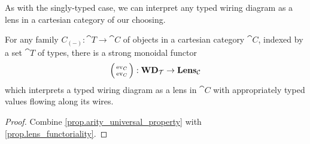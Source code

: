 \documentclass[DynamicalBook]{subfiles}
\begin{document}
As with the singly-typed case, we can interpret any typed wiring diagram as a
lens in a cartesian category of our choosing.
\begin{proposition}\label{prop.interpret_typed_wiring_diagram}
  For any family $C_{(-)} : \cat{T} \to \cat{C}$ of objects in a cartesian
  category $\cat{C}$, indexed by a set $\cat{T}$ of types, there is a strong
  monoidal functor
  $$\lens{\Fun{ev}_C}{\Fun{ev}_C} : \Cat{WD}_{\cat{T}} \to \Cat{Lens}_{\cat{C}}$$
  which interprets a typed wiring diagram as a lens in $\cat{C}$ with
  appropriately typed values flowing along its wires.
\end{proposition}
\begin{proof}
Combine \cref{prop.arity_universal_property} with \cref{prop.lens_functoriality}.
  \end{proof}
\end{document}
